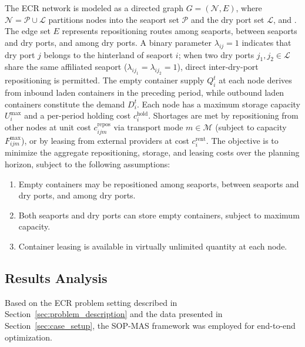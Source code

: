 \documentclass[preprint,12pt]{elsarticle}
\begin{document}
The ECR network is modeled as a directed graph $G=(\mathcal{N},E)$, where $\mathcal{N}=\mathcal{P}\cup\mathcal{L}$ partitions nodes into the seaport set $\mathcal{P}$ and the dry port set $\mathcal{L}$, and . The edge set $E$ represents repositioning routes among seaports, between seaports and dry ports, and among dry ports. A binary parameter $\lambda_{ij}=1$ indicates that dry port $j$ belongs to the hinterland of seaport $i$; when two dry ports $j_1,j_2\in\mathcal{L}$ share the same affiliated seaport ($\lambda_{ij_1}=\lambda_{ij_2}=1$), direct inter-dry-port repositioning is permitted. The empty container supply $Q_i^t$ at each node derives from inbound laden containers in the preceding period, while outbound laden containers constitute the demand $D_i^t$. Each node has a maximum storage capacity $U_i^{\max}$ and a per-period holding cost $c_i^\text{hold}$. Shortages are met by repositioning from other nodes at unit cost $c_{ijm}^\text{repos}$ via transport mode $m\in\mathcal{M}$ (subject to capacity $F_{ijm}^{\max}$), or by leasing from external providers at cost $c_i^\text{rent}$. The objective is to minimize the aggregate repositioning, storage, and leasing costs over the planning horizon, subject to the following assumptions:

\begin{enumerate}[label=\arabic*)]
    \item Empty containers may be repositioned among seaports, between seaports and dry ports, and among dry ports.
    \item Both seaports and dry ports can store empty containers, subject to maximum capacity.
    \item Container leasing is available in virtually unlimited quantity at each node.
\end{enumerate}


\subsection{Results Analysis}\label{sec:results_analysis}

Based on the ECR problem setting described in Section~\ref{sec:problem_description} and the data presented in Section~\ref{sec:case_setup}, the SOP-MAS framework was employed for end-to-end optimization.

\end{document}
